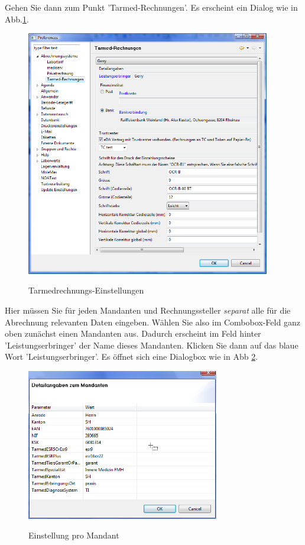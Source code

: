 \documentclass[a4paper]{scrartcl}
\begin{document}
Gehen Sie dann zum Punkt 'Tarmed-Rechnungen'. Es erscheint ein Dialog wie in Abb.\ref{fig:abr4}.
\begin{figure}
    \center
  \includegraphics[width=0.95\textwidth]{abr4}\\
  \caption{Tarmedrechnungs-Einstellungen}\label{fig:abr4}
\end{figure}
Hier müssen Sie für jeden Mandanten und Rechnungssteller \textit{separat} alle für die Abrechnung relevanten Daten eingeben. Wählen Sie also im Combobox-Feld ganz oben zunächst einen Mandanten aus. Dadurch erscheint im Feld hinter 'Leistungserbringer' der Name dieses Mandanten. Klicken Sie dann auf das blaue Wort 'Leistungserbringer'. Es öffnet sich eine Dialogbox wie in Abb \ref{fig:abr5}.
\begin{figure}
  \center
  \includegraphics[width=0.75\textwidth]{abr5}\\
  \caption{Einstellung pro Mandant}\label{fig:abr5}
\end{figure}
\end{document}
